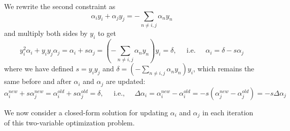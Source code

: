 \documentclass{article}
\begin{document}
We rewrite the second constraint as
\begin{equation}
  \alpha_iy_i+\alpha_jy_j=-\sum_{n\ne i,j} \alpha_ny_n
\end{equation}
and multiply both sides by $y_i$ to get
\begin{equation}
  y_i^2\alpha_i+y_iy_j\alpha_j=\alpha_i+s\alpha_j
  =\left(-\sum_{n\ne i,j} \alpha_ny_n\right)y_i
  =\delta,\;\;\;\;\;\mbox{i.e.}\;\;\;\;\;\alpha_i=\delta-s\alpha_j
  \label{2ndConstraint}
\end{equation}
where we have defined $s=y_iy_j$ and 
$\delta=(-\sum_{n\ne i,j} \alpha_ny_n)y_i$, which remains the 
same before and after $\alpha_i$ and $\alpha_j$ are updated:
\begin{equation}
  \alpha_i^{new}+s\alpha_j^{new}=\alpha_i^{old}+s\alpha_j^{old}=\delta,
  \;\;\;\;\;\mbox{i.e.,}\;\;\;\;\;
  \Delta\alpha_i=\alpha_i^{new}-\alpha_i^{old}
  =-s(\alpha_j^{new}-\alpha_j^{old})=-s\Delta\alpha_j
  \label{a1a2const}
\end{equation}

We now consider a closed-form solution for updating $\alpha_i$ and
$\alpha_j$ in each iteration of this two-variable optimization problem.
\end{document}

